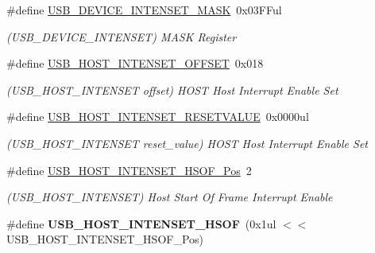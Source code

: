 \begin{DoxyCompactItemize}
\item 
\hypertarget{group___s_a_m_l21___u_s_b_ga3be7c3c27c866d64850e012a83fc4ec0}{}\#define \hyperlink{group___s_a_m_l21___u_s_b_ga3be7c3c27c866d64850e012a83fc4ec0}{U\+S\+B\+\_\+\+D\+E\+V\+I\+C\+E\+\_\+\+I\+N\+T\+E\+N\+S\+E\+T\+\_\+\+M\+A\+S\+K}~0x03\+F\+Ful\label{group___s_a_m_l21___u_s_b_ga3be7c3c27c866d64850e012a83fc4ec0}

\begin{DoxyCompactList}\small\item\em (U\+S\+B\+\_\+\+D\+E\+V\+I\+C\+E\+\_\+\+I\+N\+T\+E\+N\+S\+E\+T) M\+A\+S\+K Register \end{DoxyCompactList}\item 
\hypertarget{group___s_a_m_l21___u_s_b_gac8159edc1fdff46aa861b3b9bb188fc7}{}\#define \hyperlink{group___s_a_m_l21___u_s_b_gac8159edc1fdff46aa861b3b9bb188fc7}{U\+S\+B\+\_\+\+H\+O\+S\+T\+\_\+\+I\+N\+T\+E\+N\+S\+E\+T\+\_\+\+O\+F\+F\+S\+E\+T}~0x018\label{group___s_a_m_l21___u_s_b_gac8159edc1fdff46aa861b3b9bb188fc7}

\begin{DoxyCompactList}\small\item\em (U\+S\+B\+\_\+\+H\+O\+S\+T\+\_\+\+I\+N\+T\+E\+N\+S\+E\+T offset) H\+O\+S\+T Host Interrupt Enable Set \end{DoxyCompactList}\item 
\hypertarget{group___s_a_m_l21___u_s_b_gacddaea71188904ebb436191d27a9cb93}{}\#define \hyperlink{group___s_a_m_l21___u_s_b_gacddaea71188904ebb436191d27a9cb93}{U\+S\+B\+\_\+\+H\+O\+S\+T\+\_\+\+I\+N\+T\+E\+N\+S\+E\+T\+\_\+\+R\+E\+S\+E\+T\+V\+A\+L\+U\+E}~0x0000ul\label{group___s_a_m_l21___u_s_b_gacddaea71188904ebb436191d27a9cb93}

\begin{DoxyCompactList}\small\item\em (U\+S\+B\+\_\+\+H\+O\+S\+T\+\_\+\+I\+N\+T\+E\+N\+S\+E\+T reset\+\_\+value) H\+O\+S\+T Host Interrupt Enable Set \end{DoxyCompactList}\item 
\hypertarget{group___s_a_m_l21___u_s_b_gac5baa0844de6d4db01ed945fed8dd091}{}\#define \hyperlink{group___s_a_m_l21___u_s_b_gac5baa0844de6d4db01ed945fed8dd091}{U\+S\+B\+\_\+\+H\+O\+S\+T\+\_\+\+I\+N\+T\+E\+N\+S\+E\+T\+\_\+\+H\+S\+O\+F\+\_\+\+Pos}~2\label{group___s_a_m_l21___u_s_b_gac5baa0844de6d4db01ed945fed8dd091}

\begin{DoxyCompactList}\small\item\em (U\+S\+B\+\_\+\+H\+O\+S\+T\+\_\+\+I\+N\+T\+E\+N\+S\+E\+T) Host Start Of Frame Interrupt Enable \end{DoxyCompactList}\item 
\hypertarget{group___s_a_m_l21___u_s_b_ga684e453fd9716a693a8667034b13c303}{}\#define {\bfseries U\+S\+B\+\_\+\+H\+O\+S\+T\+\_\+\+I\+N\+T\+E\+N\+S\+E\+T\+\_\+\+H\+S\+O\+F}~(0x1ul $<$$<$ U\+S\+B\+\_\+\+H\+O\+S\+T\+\_\+\+I\+N\+T\+E\+N\+S\+E\+T\+\_\+\+H\+S\+O\+F\+\_\+\+Pos)\label{group___s_a_m_l21___u_s_b_ga684e453fd9716a693a8667034b13c303}


\end{DoxyCompactItemize}
